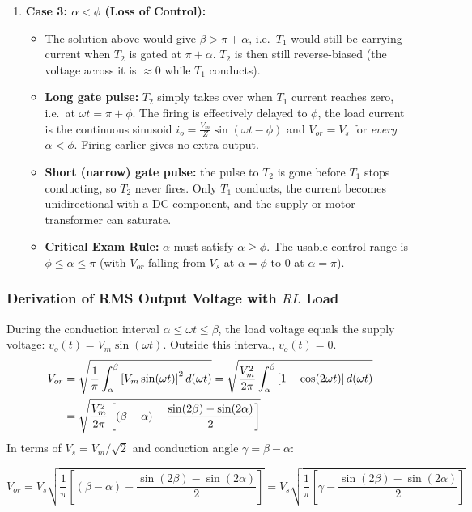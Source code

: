 \documentclass[11pt,a4paper]{article}
\begin{document}
\begin{enumerate}[leftmargin=*]
  \item \textbf{Case 3: $\alpha < \phi$ (Loss of Control):}
  \begin{itemize}
    \item The solution above would give $\beta > \pi + \alpha$, i.e.\ $T_1$ would still be carrying current when $T_2$ is gated at $\pi + \alpha$. $T_2$ is then still reverse-biased (the voltage across it is $\approx 0$ while $T_1$ conducts).
    \item \textbf{Long gate pulse:} $T_2$ simply takes over when $T_1$ current reaches zero, i.e.\ at $\omega t = \pi + \phi$. The firing is effectively delayed to $\phi$, the load current is the continuous sinusoid $i_o = \frac{V_m}{Z}\sin(\omega t - \phi)$ and $V_{or} = V_s$ for \emph{every} $\alpha < \phi$. Firing earlier gives no extra output.
    \item \textbf{Short (narrow) gate pulse:} the pulse to $T_2$ is gone before $T_1$ stops conducting, so $T_2$ never fires. Only $T_1$ conducts, the current becomes unidirectional with a DC component, and the supply or motor transformer can saturate.
    \item \textbf{Critical Exam Rule:} $\alpha$ must satisfy $\alpha \ge \phi$. The usable control range is $\phi \le \alpha \le \pi$ (with $V_{or}$ falling from $V_s$ at $\alpha=\phi$ to $0$ at $\alpha=\pi$).
  \end{itemize}
\end{enumerate}

\subsubsection{Derivation of RMS Output Voltage with $RL$ Load}
During the conduction interval $\alpha \le \omega t \le \beta$, the load voltage equals the supply voltage: $v_o(t) = V_m \sin(\omega t)$. Outside this interval, $v_o(t) = 0$.
\begin{align}
V_{or} &= \sqrt{\frac{1}{\pi} \int_{\alpha}^{\beta} \left[V_m \sin(\omega t)\right]^2 d(\omega t)} = \sqrt{\frac{V_m^2}{2\pi} \int_{\alpha}^{\beta} \left[1 - \cos(2\omega t)\right] d(\omega t)} \notag\\
&= \sqrt{\frac{V_m^2}{2\pi} \left[ (\beta - \alpha) - \frac{\sin(2\beta) - \sin(2\alpha)}{2} \right]}
\end{align}
In terms of $V_s = V_m / \sqrt{2}$ and conduction angle $\gamma = \beta - \alpha$:
\begin{formulabox}
\begin{equation}
V_{or} = V_s \sqrt{\frac{1}{\pi} \left[ (\beta - \alpha) - \frac{\sin(2\beta) - \sin(2\alpha)}{2} \right]} = V_s \sqrt{\frac{1}{\pi} \left[ \gamma - \frac{\sin(2\beta) - \sin(2\alpha)}{2} \right]}
\label{eq:acvc_rms_rl}
\end{equation}
\end{formulabox}
\end{document}
